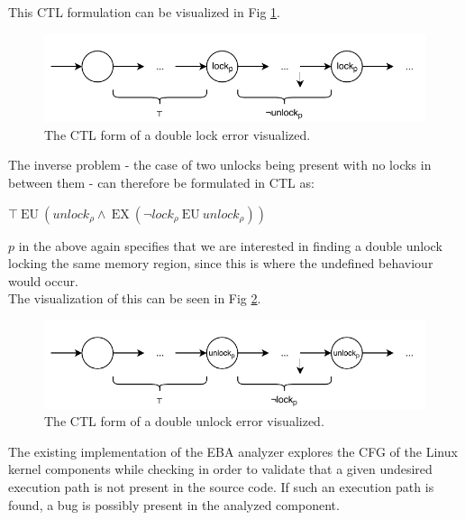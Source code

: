 \noindent This CTL formulation can be visualized in Fig \ref{fig:doublelock}.

\begin{figure}[h]
    \centering
    \includegraphics{background/figures/doublelock}
    \caption{The CTL form of a double lock error visualized.}
    \label{fig:doublelock}
\end{figure}

\noindent The inverse problem - the case of two unlocks being present with no locks in between them - can therefore be formulated in CTL as: 

\begin{center}
    $\top\:\mathrm{EU}\:\left({u n l o c k}_{\rho} \wedge\:\mathrm{EX}\:\left(\neg {l o c k}_{\rho}\:\mathrm{EU}\:{u n l o c k}_{\rho}\right)\right)$
\end{center}

\noindent $p$ in the above again specifies that we are interested in finding a double unlock locking the same memory region, since this is where the undefined behaviour would occur. \\

\noindent The visualization of this can be seen in Fig \ref{fig:doubleunlock}. \\

\begin{figure}[h]
    \centering
    \includegraphics{background/figures/doubleunlock}
    \caption{The CTL form of a double unlock error visualized.}
    \label{fig:doubleunlock}
\end{figure}

\noindent The existing implementation of the EBA analyzer explores the CFG of the Linux kernel components while checking in order to validate that a given undesired execution path is not present in the source code. If such an execution path is found, a bug is possibly present in the analyzed component. \\

